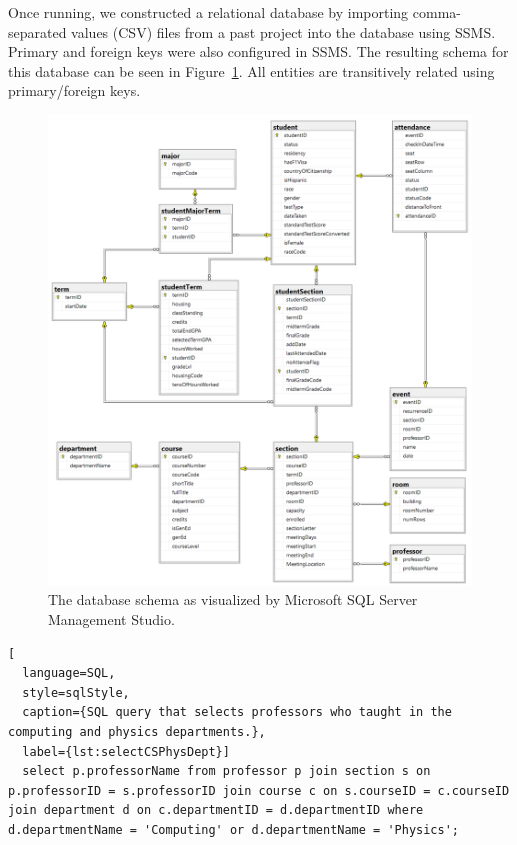 Once running, we constructed a relational database by importing comma-separated values (CSV) files from a past project \cite{hybl2023} into the database using SSMS. Primary and foreign keys were also configured in SSMS. The resulting schema for this database can be seen in Figure~\ref{fig:schema}. All entities are transitively related using primary/foreign keys.
\begin{figure}[ht]
  \centering
  \includegraphics[width=\textwidth]{figures/attendanceDBSchema.png}
  \caption{The database schema as visualized by Microsoft SQL Server Management Studio.}
  \label{fig:schema}
\end{figure}

\begin{lstlisting}[
  language=SQL,
  style=sqlStyle,
  caption={SQL query that selects professors who taught in the computing and physics departments.},
  label={lst:selectCSPhysDept}]
  select p.professorName from professor p join section s on p.professorID = s.professorID join course c on s.courseID = c.courseID join department d on c.departmentID = d.departmentID where d.departmentName = 'Computing' or d.departmentName = 'Physics';
\end{lstlisting}

